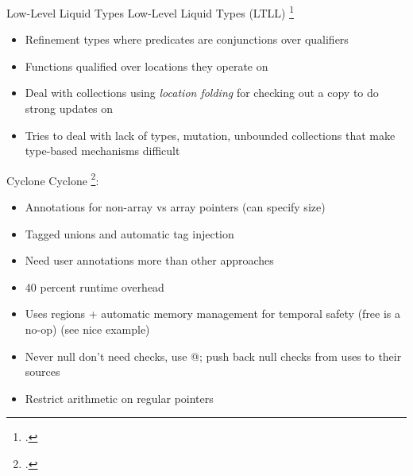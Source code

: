 \documentclass[aspectratio=169]{beamer}
\begin{document}
\begin{frame}{Low-Level Liquid Types}
Low-Level Liquid Types (LTLL) \footcite{rondon_low-level_2010}
\begin{itemize}
    \item Refinement types where predicates are conjunctions over qualifiers
    \item Functions qualified over locations they operate on
    \item Deal with collections using \emph{location folding} for checking out a copy to do strong updates on
    \item Tries to deal with lack of types, mutation, unbounded collections that make type-based mechanisms difficult
\end{itemize}
\end{frame}

\begin{frame}{Cyclone}
Cyclone \footcite{jim_cyclone:_2002}: 
\begin{itemize}
    \item Annotations for non-array vs array pointers (can specify size) %
    \item Tagged unions and automatic tag injection
    \item Need user annotations more than other approaches
    \item 40 percent runtime overhead
    \item Uses regions + automatic memory management for temporal safety (free is a no-op) (see nice example)
    \item Never null don't need checks, use @; push back null checks from uses to their sources
    \item Restrict arithmetic on regular pointers
\end{itemize}
\end{frame}
\end{document}
